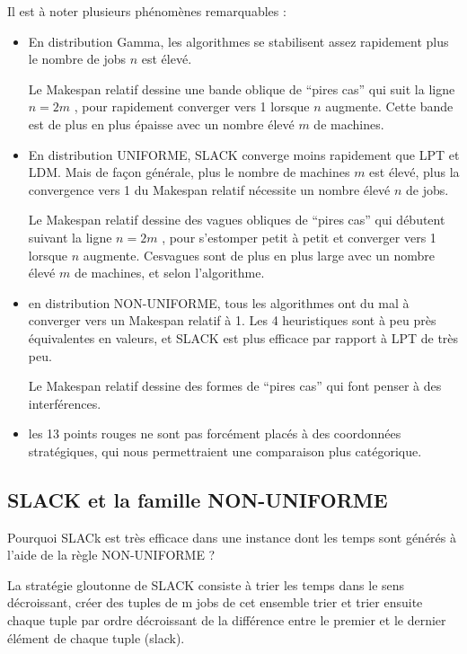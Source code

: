 \documentclass[a4paper,12pt]{report}
\theoremstyle{plain}				%
\theoremstyle{definition}				%
\begin{document}
Il est à noter plusieurs phénomènes remarquables :
\begin{itemize}
	\item En distribution Gamma, les algorithmes se stabilisent 
	assez rapidement plus le nombre de jobs $n$ est élevé.
	
	Le Makespan relatif dessine une bande oblique de ``pires cas'' 
	qui suit la ligne $n = 2m$ , pour rapidement converger vers 1 
	lorsque $n$ augmente. 
	Cette bande est de plus en plus épaisse avec un nombre 
	élevé $m$ de machines.
	 
	\item En distribution UNIFORME, SLACK converge moins rapidement que 
	LPT et LDM. Mais de façon générale, plus le nombre de machines $m$ 
	est élevé, plus la convergence vers 1 du Makespan relatif nécessite 
	un nombre élevé $n$ de jobs.
	
	Le Makespan relatif dessine des vagues obliques de ``pires cas'' 
	qui débutent suivant la ligne $n = 2m$ , pour s'estomper petit à petit 
	et converger vers 1 lorsque $n$ augmente. 
	Cesvagues sont de plus en plus large avec un nombre 
	élevé $m$ de machines, et selon l'algorithme.
	
	\item en distribution NON-UNIFORME, tous les algorithmes ont du mal 
	à converger vers un Makespan relatif à 1. Les 4 heuristiques sont à 
	peu près équivalentes en valeurs, et SLACK est plus efficace par 
	rapport à LPT de très peu.
	
	Le Makespan relatif dessine des formes de ``pires cas'' qui font penser 
	à des interférences.
	
	\item les 13 points rouges ne sont pas forcément placés à des 
	coordonnées stratégiques, qui nous permettraient une comparaison 
	plus catégorique. 
\end{itemize}

\subsection{SLACK et la famille NON-UNIFORME}
\label{ssec:resultatsSLACKNonUniforme}

Pourquoi SLACk est très efficace dans une instance dont les temps sont générés à l'aide de la 
  règle NON-UNIFORME ? 
  
La stratégie gloutonne de SLACK consiste à 
  trier les temps dans le sens décroissant,
  créer des tuples de m jobs de cet ensemble trier 
  et trier ensuite chaque tuple par ordre décroissant de la différence 
  entre le premier et le dernier élément de chaque tuple (slack).
\end{document}
